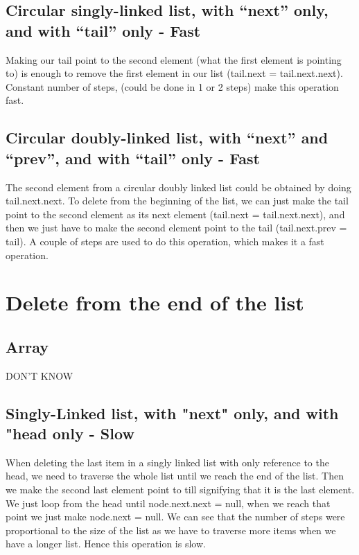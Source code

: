 \documentclass{article}
\begin{document}
\subsection{Circular singly-linked list, with “next” only, and with “tail” only - Fast}
Making our tail point to the second element (what the first element is pointing to) is enough to remove the first element in our list (tail.next = tail.next.next). Constant number of steps, (could be done in 1 or 2 steps) make this operation fast. 

\subsection{Circular doubly-linked list, with “next” and “prev”, and with “tail” only - Fast}
The second element from a circular doubly linked list could be obtained by doing tail.next.next. To delete from the beginning of the list, we can just make the tail point to the second element as its next element (tail.next = tail.next.next), and then we just have to make the second element point to the tail (tail.next.prev = tail). A couple of steps are used to do this operation, which makes it a fast operation.




\section{Delete from the end of the list}
\subsection{Array}
DON'T KNOW

\subsection{Singly-Linked list, with "next" only, and with "head only - Slow}
When deleting the last item in a singly linked list with only reference to the head, we need to traverse the whole list until we reach the end of the list. Then we make the second last element point to till signifying that it is the last element. We just loop from the head until node.next.next = null, when we reach that point we just make node.next = null. We can see that the number of steps were proportional to the size of the list as we have to traverse more items when we have a longer list. Hence this operation is slow.
\end{document}
